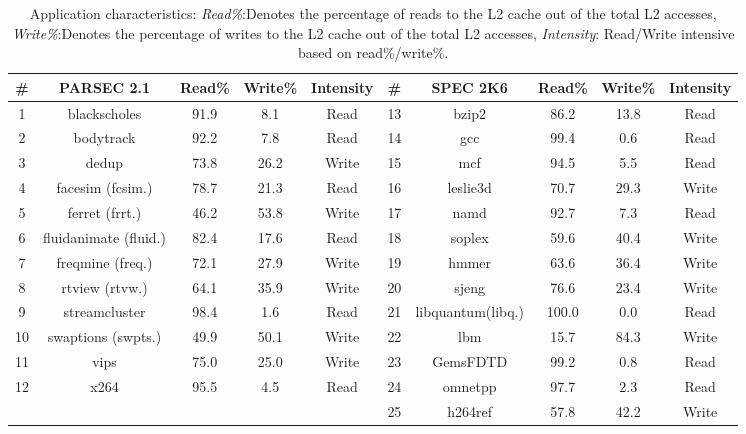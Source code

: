 \begin {table}[t]
 \centering
  \singlespacing
 \caption{{Application characteristics}: {\it Read\%}:Denotes the percentage of reads to the L2 cache out of the total L2 accesses,
 {\it Write\%}:Denotes the percentage of writes to the L2 cache out of the total L2 accesses, {\it Intensity}: Read/Write intensive based on read\%/write\%.}
 \label{table:benchmark}
 \scriptsize
\begin{tabular}{||c|c|c|c|c||c|c|c|c|c||}
\hline
\# & PARSEC 2.1 & Read\% & Write\% & Intensity & \# & SPEC 2K6 & Read\% & Write\% & Intensity \\
\hline \hline
1 & blackscholes  &  91.9 &  8.1 &   Read &  13 &  bzip2 & 86.2 & 13.8 & Read \\
\hline
2 &     bodytrack  &     92.2 &  7.8 &   Read &  14 & gcc &  99.4 &  0.6 & Read \\
\hline
3 &     dedup  & 73.8 &  26.2 &  Write & 15 &    mcf & 94.5 &  5.5 & Read \\
\hline
4 &     facesim (fcsim.) & 78.7 &  21.3 &  Read &  16 & leslie3d & 70.7 & 29.3 & Write \\
\hline
5 &     ferret (frrt.) & 46.2 &  53.8 &  Write & 17 & namd &  92.7 &  7.3 & Read \\
\hline
6 &     fluidanimate (fluid.) &  82.4 &  17.6 &  Read &  18 & soplex & 59.6 & 40.4 & Write \\
\hline
7 &     freqmine (freq.) & 72.1 & 27.9 & Write & 19 & hmmer &   63.6 &  36.4 &  Write \\
\hline
8 &     rtview (rtvw.) & 64.1 & 35.9 &  Write & 20 & sjeng & 76.6 &  23.4 &  Write \\
\hline
9 &     streamcluster & 98.4 &  1.6 &   Read &  21 & libquantum(libq.) & 100.0 & 0.0 & Read \\
\hline
10 &    swaptions (swpts.) & 49.9 & 50.1 & Write & 22 & lbm & 15.7 & 84.3 & Write \\
\hline
11 &    vips &  75.0 &  25.0 &  Write &  23 & GemsFDTD & 99.2 & 0.8 & Read \\
\hline
12 &    x264 &  95.5 &  4.5 & Read &  24 & omnetpp & 97.7 & 2.3 & Read \\
\hline
& & & & & 25 &  h264ref & 57.8 &  42.2 &  Write \\
\hline \hline
\end{tabular}
\end{table}



